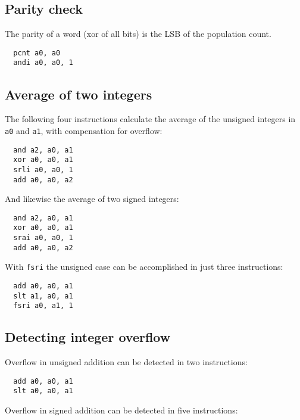 \subsection{Parity check}

The parity of a word (xor of all bits) is the LSB of the population count.

\begin{verbatim}
  pcnt a0, a0
  andi a0, a0, 1
\end{verbatim}


\subsection{Average of two integers}

The following four instructions calculate the average of the unsigned
integers in {\tt a0} and {\tt a1}, with compensation for overflow:

\begin{verbatim}
  and a2, a0, a1
  xor a0, a0, a1
  srli a0, a0, 1
  add a0, a0, a2
\end{verbatim}

And likewise the average of two signed integers:

\begin{verbatim}
  and a2, a0, a1
  xor a0, a0, a1
  srai a0, a0, 1
  add a0, a0, a2
\end{verbatim}

With {\tt fsri} the unsigned case can be accomplished in just three
instructions:

\begin{verbatim}
  add a0, a0, a1
  slt a1, a0, a1
  fsri a0, a1, 1
\end{verbatim}


\subsection{Detecting integer overflow}

Overflow in unsigned addition can be detected in two instructions:

\begin{verbatim}
  add a0, a0, a1
  slt a0, a0, a1
\end{verbatim}

Overflow in signed addition can be detected in five instructions:

